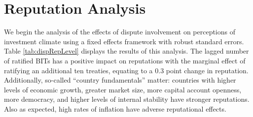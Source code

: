 \documentclass[12pt,onesided]{amsart}
\begin{document}
\section*{Reputation Analysis}

We begin the analysis of the effects of dispute involvement on perceptions of investment climate using a fixed effects framework with robust standard errors. Table \ref{tab:dispRepLevel} displays the results of this analysis. The lagged number of ratified BITs has a positive impact on reputations with the marginal effect of ratifying an additional ten treaties, equating to a 0.3 point change in reputation. Additionally, so-called ``country fundamentals'' matter: countries with higher levels of economic growth, greater market size, more capital account openness, more democracy, and higher levels of internal stability have stronger reputations. Also as expected, high rates of inflation have adverse reputational effects.
\end{document}
